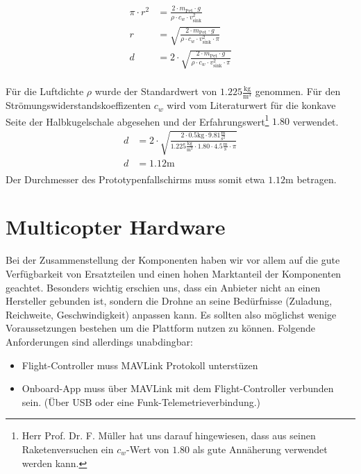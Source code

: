 \begin{equation}
\begin{split}
\pi \cdot r^2 &= \frac{2 \cdot m_{\text{Pet}} \cdot g}{\rho \cdot c_{w} \cdot v_{\text{sink}}^{2} } \\
r &= \sqrt{\frac{2 \cdot m_{\text{Pet}} \cdot g}{\rho \cdot c_{w} \cdot v_{\text{sink}}^{2} \cdot \pi}} \\
d &= 2 \cdot \sqrt{\frac{2 \cdot m_{\text{Pet}} \cdot g}{\rho \cdot c_{w} \cdot v_{\text{sink}}^{2} \cdot \pi}} \\
\end{split}
\end{equation}

Für die Luftdichte $\rho$ wurde der Standardwert von $1.225 \frac{\text{kg}}{\text{m}^{3}}$ genommen. Für den Strömungswiderstandskoeffizenten $c_w$ wird vom Literaturwert für die konkave Seite der Halbkugelschale abgesehen und der Erfahrungswert\footnote{Herr Prof. Dr. F. Müller hat uns darauf hingewiesen, dass aus seinen Raketenversuchen ein $c_w$-Wert von $1.80$ als gute Annäherung verwendet werden kann.} $1.80$ verwendet.
\begin{equation}
\begin{split}
d &= 2 \cdot \sqrt{\frac{2 \cdot 0.5\text{kg} \cdot  9.81\frac{\text{m}}{\text{s}^2}}{1.225 \frac{\text{kg}}{\text{m}^3} \cdot 1.80 \cdot 4.5 \frac{\text{m}}{\text{s}} \cdot \pi}} \\
d &= 1.12\text{m} \\
\end{split}
\end{equation}
Der Durchmesser des Prototypenfallschirms muss somit etwa $1.12 \text{m}$ betragen.

\newpage
\section{Multicopter Hardware}

Bei der Zusammenstellung der Komponenten haben wir vor allem auf die gute Verfügbarkeit von
Ersatzteilen und einen hohen Marktanteil der Komponenten geachtet. Besonders wichtig erschien uns, dass ein Anbieter nicht an einen Hersteller gebunden ist, sondern die Drohne an seine Bedürfnisse (Zuladung, Reichweite, Geschwindigkeit) anpassen kann. Es sollten also möglichst wenige Voraussetzungen bestehen um die Plattform nutzen zu können. Folgende Anforderungen sind allerdings unabdingbar:
\begin{itemize}
	\item Flight-Controller muss \Gls{MAVLink} Protokoll unterstüzen
	\item Onboard-App muss über MAVLink mit dem Flight-Controller verbunden sein. (Über USB oder eine Funk-Telemetrieverbindung.)
\end{itemize}

